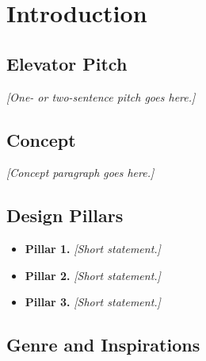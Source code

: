 \section{Introduction}

\subsection{Elevator Pitch}


\textit{[One- or two-sentence pitch goes here.]}

\subsection{Concept}


\textit{[Concept paragraph goes here.]}

\subsection{Design Pillars}


\begin{itemize}
    \item \textbf{Pillar 1.} \textit{[Short statement.]}
    \item \textbf{Pillar 2.} \textit{[Short statement.]}
    \item \textbf{Pillar 3.} \textit{[Short statement.]}
\end{itemize}

\subsection{Genre and Inspirations}


